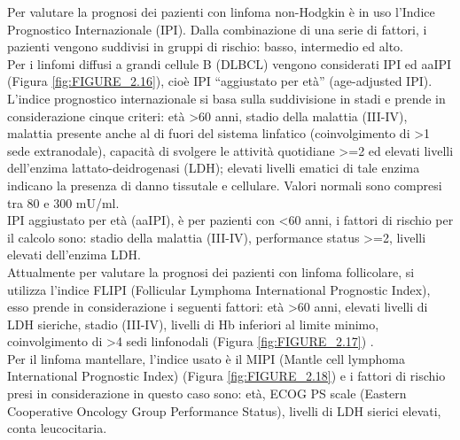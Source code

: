 Per valutare la prognosi dei pazienti con linfoma non-Hodgkin è in uso l’Indice Prognostico Internazionale (IPI). 
Dalla combinazione di una serie di fattori, i pazienti vengono suddivisi in gruppi di rischio: basso, intermedio 
ed alto.\\ 
Per i linfomi diffusi a grandi cellule B (DLBCL) vengono considerati IPI ed aaIPI (Figura \ref{fig:FIGURE_2.16}), 
cioè IPI “aggiustato per età” (age-adjusted IPI)\cite{AIOM}.
L’indice prognostico internazionale si basa sulla suddivisione in stadi e prende in considerazione cinque criteri: 
età >60 anni, stadio della malattia (III-IV), malattia presente anche al di fuori del sistema linfatico 
(coinvolgimento di >1 sede extranodale), capacità di svolgere le attività quotidiane >=2 ed elevati livelli 
dell’enzima lattato-deidrogenasi (LDH); elevati livelli ematici di tale enzima indicano la presenza di 
danno tissutale e cellulare. Valori normali sono compresi tra 80 e 300 mU/ml.\\ 
IPI aggiustato per età (aaIPI), è per pazienti con <60 anni, i fattori di rischio per il calcolo sono: 
stadio della malattia (III-IV), performance status >=2, livelli elevati dell’enzima LDH\cite{AIOM}.\\
Attualmente per valutare la prognosi dei pazienti con linfoma follicolare, si utilizza l’indice FLIPI 
(Follicular Lymphoma International Prognostic Index), esso prende in considerazione i seguenti fattori: 
età >60 anni, elevati livelli di LDH sieriche, stadio (III-IV), livelli di Hb inferiori al limite minimo, 
coinvolgimento di >4 sedi linfonodali (Figura \ref{fig:FIGURE_2.17}) \cite{AIOM}.\\
Per il linfoma mantellare, l’indice usato è il MIPI (Mantle cell lymphoma International Prognostic Index) 
(Figura \ref{fig:FIGURE_2.18}) e i fattori di rischio presi in considerazione in questo caso sono: età, ECOG PS scale 
(Eastern Cooperative Oncology Group Performance Status), livelli di LDH sierici elevati, conta leucocitaria\cite{MIPI}.\\

